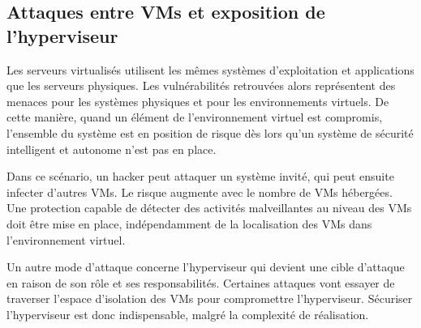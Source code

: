 \subsection*{Attaques entre VMs et exposition de l'hyperviseur}

Les serveurs virtualisés utilisent les mêmes systèmes d'exploitation et applications que les serveurs physiques. Les vulnérabilités retrouvées alors représentent des menaces pour les systèmes physiques et pour les environnements virtuels. De cette manière, quand un élément de l'environnement virtuel est compromis, l'ensemble du système est en position de risque dès lors qu'un système de sécurité intelligent et autonome n'est pas en place. 

Dans ce scénario, un hacker peut attaquer un système invité, qui peut ensuite infecter d'autres VMs. Le risque augmente avec le nombre de VMs hébergées. Une protection capable de détecter des activités malveillantes au niveau des VMs doit être mise en place, indépendamment de la localisation des VMs dans l'environnement virtuel.

Un autre mode d'attaque concerne l'hyperviseur qui devient une cible d'attaque en raison de son rôle et ses responsabilités. Certaines attaques vont essayer de traverser l'espace d'isolation des VMs pour compromettre l'hyperviseur. Sécuriser l'hyperviseur est donc indispensable, malgré la complexité de réalisation.

